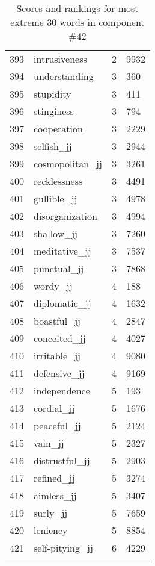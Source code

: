 \begin{longtable}[!htbp]{| rlr@{.}l |}
    393 & intrusiveness & 2 & 9932 \\
    394 & understanding & 3 & 360 \\
    395 & stupidity & 3 & 411 \\
    396 & stinginess & 3 & 794 \\
    397 & cooperation & 3 & 2229 \\
    398 & selfish\_jj & 3 & 2944 \\
    399 & cosmopolitan\_jj & 3 & 3261 \\
    400 & recklessness & 3 & 4491 \\
    401 & gullible\_jj & 3 & 4978 \\
    402 & disorganization & 3 & 4994 \\
    403 & shallow\_jj & 3 & 7260 \\
    404 & meditative\_jj & 3 & 7537 \\
    405 & punctual\_jj & 3 & 7868 \\
    406 & wordy\_jj & 4 & 188 \\
    407 & diplomatic\_jj & 4 & 1632 \\
    408 & boastful\_jj & 4 & 2847 \\
    409 & conceited\_jj & 4 & 4027 \\
    410 & irritable\_jj & 4 & 9080 \\
    411 & defensive\_jj & 4 & 9169 \\
    412 & independence & 5 & 193 \\
    413 & cordial\_jj & 5 & 1676 \\
    414 & peaceful\_jj & 5 & 2124 \\
    415 & vain\_jj & 5 & 2327 \\
    416 & distrustful\_jj & 5 & 2903 \\
    417 & refined\_jj & 5 & 3274 \\
    418 & aimless\_jj & 5 & 3407 \\
    419 & surly\_jj & 5 & 7659 \\
    420 & leniency & 5 & 8854 \\
    421 & self-pitying\_jj & 6 & 4229 \\
    \hline
    \caption{Scores and rankings for most extreme 30 words in component \#42} \\
\end{longtable}
